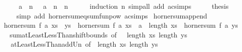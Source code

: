 \begin{isabellebody}
%
\isadelimproof
%
\endisadelimproof
%
\isatagproof
{}\isamarkupfalse%
\ {\isacharminus}{\kern0pt}\isanewline
\ \ \isamarkupfalse%
\ {\isacartoucheopen}{\isacharparenleft}{\kern0pt}{\isacharasterisk}{\kern0pt}{\isacharparenright}{\kern0pt}\ a\ {\isacharcircum}{\kern0pt}{\isacharcircum}{\kern0pt}\ n\ {\isacharequal}{\kern0pt}\ {\isacharparenleft}{\kern0pt}{\isacharasterisk}{\kern0pt}{\isacharparenright}{\kern0pt}\ {\isacharparenleft}{\kern0pt}a\ {\isacharcircum}{\kern0pt}\ n{\isacharparenright}{\kern0pt}{\isacartoucheclose}\ \ n\isanewline
\ \ \ \ \isamarkupfalse%
\ {\isacharparenleft}{\kern0pt}induction\ n{\isacharparenright}{\kern0pt}\ {\isacharparenleft}{\kern0pt}simp{\isacharunderscore}{\kern0pt}all\ add{\isacharcolon}{\kern0pt}\ ac{\isacharunderscore}{\kern0pt}simps{\isacharparenright}{\kern0pt}\isanewline
\ \ \isamarkupfalse%
\ \isamarkupfalse%
\ {\isacharquery}{\kern0pt}thesis\isanewline
\ \ \ \ \isamarkupfalse%
\ {\isacharparenleft}{\kern0pt}simp\ add{\isacharcolon}{\kern0pt}\ horner{\isacharunderscore}{\kern0pt}sum{\isacharunderscore}{\kern0pt}eq{\isacharunderscore}{\kern0pt}sum{\isacharunderscore}{\kern0pt}funpow\ ac{\isacharunderscore}{\kern0pt}simps{\isacharparenright}{\kern0pt}\isanewline
{}\isamarkupfalse%
%
\endisatagproof
{\isafoldproof}%
%
\isadelimproof
\isanewline
%
\endisadelimproof
\isanewline
{}\isamarkupfalse%
\ horner{\isacharunderscore}{\kern0pt}sum{\isacharunderscore}{\kern0pt}append{\isacharcolon}{\kern0pt}\isanewline
\ \ {\isacartoucheopen}horner{\isacharunderscore}{\kern0pt}sum\ f\ a\ {\isacharparenleft}{\kern0pt}xs\ {\isacharat}{\kern0pt}\ ys{\isacharparenright}{\kern0pt}\ {\isacharequal}{\kern0pt}\ horner{\isacharunderscore}{\kern0pt}sum\ f\ a\ xs\ {\isacharplus}{\kern0pt}\ a\ {\isacharcircum}{\kern0pt}\ length\ xs\ {\isacharasterisk}{\kern0pt}\ horner{\isacharunderscore}{\kern0pt}sum\ f\ a\ ys{\isacartoucheclose}\isanewline
%
\isadelimproof
\ \ %
\endisadelimproof
%
\isatagproof
{}\isamarkupfalse%
\ sum{\isachardot}{\kern0pt}atLeastLessThan{\isacharunderscore}{\kern0pt}shift{\isacharunderscore}{\kern0pt}bounds\ {\isacharbrackleft}{\kern0pt}of\ {\isacharunderscore}{\kern0pt}\ {}\ {\isacartoucheopen}length\ xs{\isacartoucheclose}\ {\isacartoucheopen}length\ ys{\isacartoucheclose}{\isacharbrackright}{\kern0pt}\isanewline
\ \ \ \ atLeastLessThan{\isacharunderscore}{\kern0pt}add{\isacharunderscore}{\kern0pt}Un\ {\isacharbrackleft}{\kern0pt}of\ {}\ {\isacartoucheopen}length\ xs{\isacartoucheclose}\ {\isacartoucheopen}length\ ys{\isacartoucheclose}{\isacharbrackright}{\kern0pt}\isanewline

\end{isabellebody}
